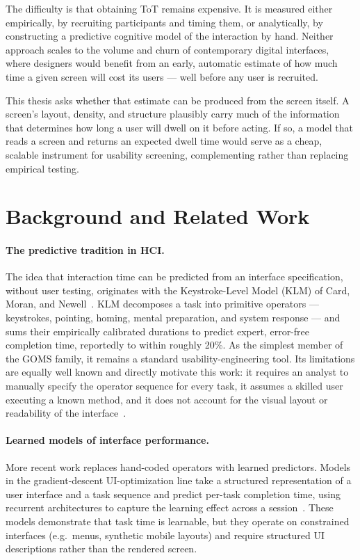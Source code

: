 \documentclass[11pt,a4paper]{article}
\begin{document}
The difficulty is that obtaining ToT remains expensive. It is measured either empirically, by recruiting participants and timing them, or analytically, by constructing a predictive cognitive model of the interaction by hand. Neither approach scales to the volume and churn of contemporary digital interfaces, where designers would benefit from an early, automatic estimate of how much time a given screen will cost its users --- well before any user is recruited.

This thesis asks whether that estimate can be produced from the screen itself. A screen's layout, density, and structure plausibly carry much of the information that determines how long a user will dwell on it before acting. If so, a model that reads a screen and returns an expected dwell time would serve as a cheap, scalable instrument for usability screening, complementing rather than replacing empirical testing.

\section{Background and Related Work}

\paragraph{The predictive tradition in HCI.} The idea that interaction time can be predicted from an interface specification, without user testing, originates with the Keystroke-Level Model (KLM) of Card, Moran, and Newell~\cite{klm1980,psychologyhci}. KLM decomposes a task into primitive operators --- keystrokes, pointing, homing, mental preparation, and system response --- and sums their empirically calibrated durations to predict expert, error-free completion time, reportedly to within roughly 20\%. As the simplest member of the GOMS family, it remains a standard usability-engineering tool. Its limitations are equally well known and directly motivate this work: it requires an analyst to manually specify the operator sequence for every task, it assumes a skilled user executing a known method, and it does not account for the visual layout or readability of the interface~\cite{klmreview}.

\paragraph{Learned models of interface performance.} More recent work replaces hand-coded operators with learned predictors. Models in the gradient-descent UI-optimization line take a structured representation of a user interface and a task sequence and predict per-task completion time, using recurrent architectures to capture the learning effect across a session~\cite{deepui}. These models demonstrate that task time is learnable, but they operate on constrained interfaces (e.g.\ menus, synthetic mobile layouts) and require structured UI descriptions rather than the rendered screen.
\end{document}
